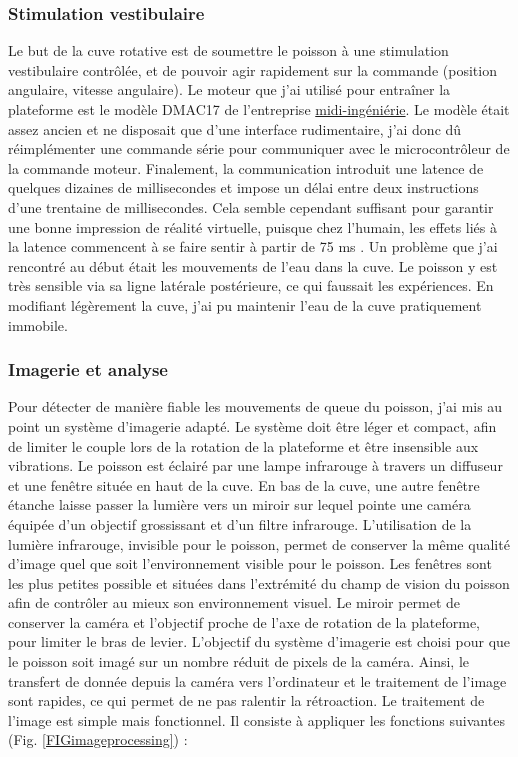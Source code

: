 \subsubsection{Stimulation vestibulaire}
Le but de la cuve rotative est de soumettre le poisson à une stimulation vestibulaire contrôlée, et de pouvoir agir rapidement sur la commande (position angulaire, vitesse angulaire). Le moteur que j'ai utilisé pour entraîner la plateforme est le modèle DMAC17 de l'entreprise \href{http://www.midi-ingenierie.com/}{midi-ingéniérie}. Le modèle était assez ancien et ne disposait que d'une interface rudimentaire, j'ai donc dû réimplémenter une commande série pour communiquer avec le microcontrôleur de la commande moteur. Finalement, la communication introduit une latence de quelques dizaines de millisecondes et impose un délai entre deux instructions d'une trentaine de millisecondes. Cela semble cependant suffisant pour garantir une bonne impression de réalité virtuelle, puisque chez l'humain, les effets liés à la latence commencent à se faire sentir à partir de 75 ms \cite{waltemate_impact_2016}. Un problème que j'ai rencontré au début était les mouvements de l'eau dans la cuve. Le poisson y est très sensible via sa ligne latérale postérieure, ce qui faussait les expériences. En modifiant légèrement la cuve, j'ai pu maintenir l'eau de la cuve pratiquement immobile.

\subsubsection{Imagerie et analyse}
Pour détecter de manière fiable les mouvements de queue du poisson, j'ai mis au point un système d'imagerie adapté. Le système doit être léger et compact, afin de limiter le couple lors de la rotation de la plateforme et être insensible aux vibrations. Le poisson est éclairé par une lampe infrarouge à travers un diffuseur et une fenêtre située en haut de la cuve. En bas de la cuve, une autre fenêtre étanche laisse passer la lumière vers un miroir sur lequel pointe une caméra équipée d'un objectif grossissant et d'un filtre infrarouge. L'utilisation de la lumière infrarouge, invisible pour le poisson, permet de conserver la même qualité d'image quel que soit l'environnement visible pour le poisson. Les fenêtres sont les plus petites possible et situées dans l'extrémité du champ de vision du poisson afin de contrôler au mieux son environnement visuel. Le miroir permet de conserver la caméra et l'objectif proche de l'axe de rotation de la plateforme, pour limiter le bras de levier.
L'objectif du système d'imagerie est choisi pour que le poisson soit imagé sur un nombre réduit de pixels de la caméra. Ainsi, le transfert de donnée depuis la caméra vers l'ordinateur et le traitement de l'image sont rapides, ce qui permet de ne pas ralentir la rétroaction. Le traitement de l'image est simple mais fonctionnel. Il consiste à appliquer les fonctions suivantes (Fig. \ref{FIGimageprocessing}) :

